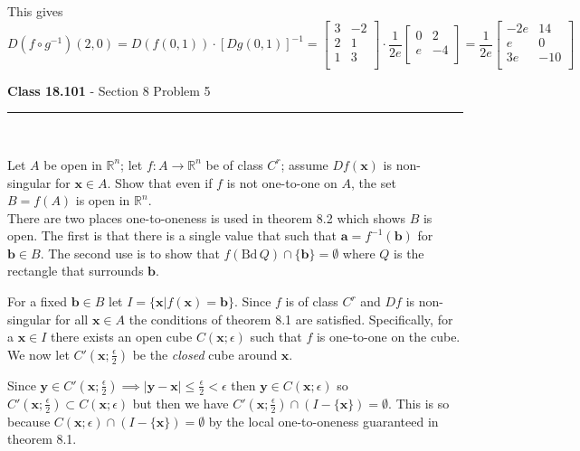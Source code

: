\documentclass[11pt,reqno]{article}
\begin{document}
\noindent This gives
\[ D(f \circ g^{-1}) (2,0) = D(f(0,1)) \cdot [D g (0,1)]^{-1} =   \left[ \begin{array}{cc}
3 & -2 \\
2 & 1 \\
1 & 3 \\
\end{array} \right] \cdot \frac{1}{2 e} \left[ \begin{array}{cc}
0 & 2 \\
e & -4 \\
\end{array} \right] =  \frac{1}{2 e} \left[ \begin{array}{cc}
-2e & 14 \\
e & 0 \\
3 e & -10 \\
\end{array} \right] \]


\begin{flushleft} 
\textbf{Class 18.101} - Section 8 Problem 5\\
\rule{500pt}{1pt}\\
\end{flushleft} 

Let $A$ be open in $\mathbb{R}^n$; let $f : A \to \mathbb{R}^n$ be of class $C^r$; assume $Df(\textbf{x})$ is non-singular for $\textbf{x} \in A$. Show that even if $f$ is not one-to-one on $A$, the set $B = f(A)$ is open in $\mathbb{R}^n$.\\

There are two places one-to-oneness is used in theorem 8.2 which shows $B$ is open. The first is that there is a single value that such that $\textbf{a} = f^{-1}(\textbf{b})$ for $\textbf{b} \in B$. The second use is to show that $f(\text{Bd}\, Q) \cap \{ \textbf{b} \} = \emptyset$ where $Q$ is the rectangle that surrounds $\textbf{b}$.

For a fixed $\textbf{b} \in B$ let $I = \{ \textbf{x} | f(\textbf{x}) = \textbf{b} \}$. Since $f$ is of class $C^r$ and $D f$ is non-singular for all $\textbf{x} \in A$ the conditions of theorem 8.1 are satisfied. Specifically, for a $\textbf{x} \in I$ there exists an open cube $C(\textbf{x};\epsilon)$ such that $f$ is one-to-one on the cube. We now let $C'(\textbf{x};\frac{\epsilon}{2})$ be the \emph{closed} cube around $\textbf{x}$.

Since $\textbf{y} \in C'(\textbf{x};\frac{\epsilon}{2}) \implies |\textbf{y}-\textbf{x}| \le \frac{\epsilon}{2} < \epsilon$ then $\textbf{y} \in C(\textbf{x};\epsilon)$ so $C'(\textbf{x};\frac{\epsilon}{2}) \subset C(\textbf{x};\epsilon)$ but then we have $ C'(\textbf{x};\frac{\epsilon}{2}) \cap (I - \{ \textbf{x} \}) = \emptyset$. This is so because $C(\textbf{x};\epsilon) \cap (I - \{ \textbf{x} \}) = \emptyset$ by the local one-to-oneness guaranteed in theorem 8.1.
\end{document}
